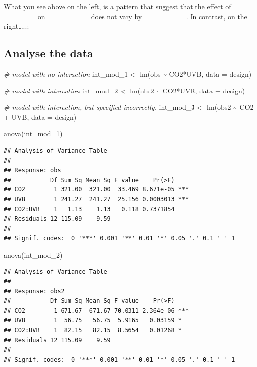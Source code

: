 \documentclass[
]{book}
\newenvironment{Shaded}{\begin{snugshade}}{\end{snugshade}}
\newcommand{\AttributeTok}[1]{\textcolor[rgb]{0.77,0.63,0.00}{#1}}
\newcommand{\CommentTok}[1]{\textcolor[rgb]{0.56,0.35,0.01}{\textit{#1}}}
\newcommand{\FunctionTok}[1]{\textcolor[rgb]{0.00,0.00,0.00}{#1}}
\newcommand{\NormalTok}[1]{#1}
\newcommand{\OtherTok}[1]{\textcolor[rgb]{0.56,0.35,0.01}{#1}}
\newcommand{\SpecialCharTok}[1]{\textcolor[rgb]{0.00,0.00,0.00}{#1}}
\begin{document}
What you see above on the left, is a pattern that suggest that the effect of \_\_\_\_\_\_ on \_\_\_\_\_\_\_\_ does not vary by \_\_\_\_\_\_\_\_. In contrast, on the right\ldots..:

\hypertarget{analyse-the-data}{%
\subsection{Analyse the data}\label{analyse-the-data}}

\begin{Shaded}
\begin{Highlighting}[]
\CommentTok{\# model with no interaction}
\NormalTok{int\_mod\_1 }\OtherTok{\textless{}{-}} \FunctionTok{lm}\NormalTok{(obs }\SpecialCharTok{\textasciitilde{}}\NormalTok{ CO2}\SpecialCharTok{*}\NormalTok{UVB, }\AttributeTok{data =}\NormalTok{ design)}

\CommentTok{\# model with interaction}
\NormalTok{int\_mod\_2 }\OtherTok{\textless{}{-}} \FunctionTok{lm}\NormalTok{(obs2 }\SpecialCharTok{\textasciitilde{}}\NormalTok{ CO2}\SpecialCharTok{*}\NormalTok{UVB, }\AttributeTok{data =}\NormalTok{ design)}

\CommentTok{\# model with interaction, but specified incorrectly.}
\NormalTok{int\_mod\_3 }\OtherTok{\textless{}{-}} \FunctionTok{lm}\NormalTok{(obs2 }\SpecialCharTok{\textasciitilde{}}\NormalTok{ CO2 }\SpecialCharTok{+}\NormalTok{ UVB, }\AttributeTok{data =}\NormalTok{ design)}

\FunctionTok{anova}\NormalTok{(int\_mod\_1)}
\end{Highlighting}
\end{Shaded}

\begin{verbatim}
## Analysis of Variance Table
## 
## Response: obs
##           Df Sum Sq Mean Sq F value    Pr(>F)    
## CO2        1 321.00  321.00  33.469 8.671e-05 ***
## UVB        1 241.27  241.27  25.156 0.0003013 ***
## CO2:UVB    1   1.13    1.13   0.118 0.7371854    
## Residuals 12 115.09    9.59                      
## ---
## Signif. codes:  0 '***' 0.001 '**' 0.01 '*' 0.05 '.' 0.1 ' ' 1
\end{verbatim}

\begin{Shaded}
\begin{Highlighting}[]
\FunctionTok{anova}\NormalTok{(int\_mod\_2)}
\end{Highlighting}
\end{Shaded}

\begin{verbatim}
## Analysis of Variance Table
## 
## Response: obs2
##           Df Sum Sq Mean Sq F value    Pr(>F)    
## CO2        1 671.67  671.67 70.0311 2.364e-06 ***
## UVB        1  56.75   56.75  5.9165   0.03159 *  
## CO2:UVB    1  82.15   82.15  8.5654   0.01268 *  
## Residuals 12 115.09    9.59                      
## ---
## Signif. codes:  0 '***' 0.001 '**' 0.01 '*' 0.05 '.' 0.1 ' ' 1
\end{verbatim}
\end{document}
